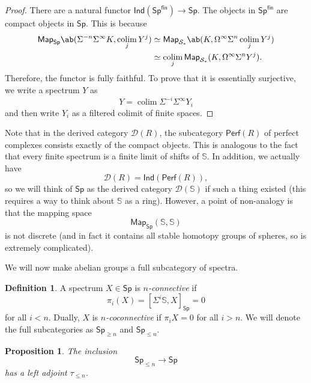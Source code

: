 \documentclass[10pt, oneside]{memoir}
\newtheorem{prop}[thm]{Proposition}
\theoremstyle{definition}
\newtheorem{defn}[thm]{Definition}
\theoremstyle{remark}
\theoremstyle{plain}
\theoremstyle{definition}
\theoremstyle{remark}
\newcommand{\bS}{\mathbb{S}}
\newcommand{\mc}[1]{\mathcal{#1}}
\newcommand{\ms}[1]{\mathsf{#1}}
\newcommand{\1}{\mathbf{1}}
\newcommand{\2}{\mathbf{2}}
\newcommand{\3}{\mathbf{3}}
\DeclareMathOperator*{\colim}{colim}
\begin{document}
\begin{proof}
    There are a natural functor \(\ms{Ind}(\ms{Sp}^{\ms{fin}}) \to \ms{Sp} \). The objects in \(\ms{Sp}^{\ms{fin}} \) are compact objects in \(\ms{Sp} \). This is because
    \begin{align*}
        \ms{Map}_{\ms{Sp}}\ab(\Sigma^{-n} \Sigma^{\infty} K, \colim_j Y^j) &\simeq \ms{Map}_{\mc{S}_*} \ab(K, \Omega^{\infty} \Sigma^n \colim_j Y^j) \\
        &\simeq \colim_j \ms{Map}_{\mc{S}_*}(K, \Omega^{\infty} \Sigma^n Y^j).
    \end{align*}
    Therefore, the functor is fully faithful. To prove that it is essentially surjective, we write a spectrum \(Y \) as
    \[ Y = \colim \Sigma^{-i} \Sigma^{\infty} Y_i \]
    and then write \(Y_i \) as a filtered colimit of finite spaces.
\end{proof}

Note that in the derived category \(\mc{D}(R) \), the subcategory \(\ms{Perf}(R) \) of perfect complexes consists exactly of the compact objects. This is analogous to the fact that every finite spectrum is a finite limit of shifts of \(\bS \). In addition, we actually have
\[ \mc{D}(R) = \ms{Ind}(\ms{Perf}(R)), \]
so we will think of \(\ms{Sp} \) as the derived category \(\mc{D}(\bS) \) if such a thing existed (this requires a way to think about \(\bS \) as a ring). However, a point of non-analogy is that the mapping space
\[ \ms{Map}_{\ms{Sp}}(\bS, \bS) \]
is not discrete (and in fact it contains all stable homotopy groups of spheres, so is extremely complicated).

We will now make abelian groups a full subcategory of spectra.
\begin{defn}
    A spectrum \(X \in \ms{Sp} \) is \textit{\(n \)-connective} if 
    \[ \pi_i (X) = [\Sigma^i \bS, X]_{\ms{Sp}} = 0 \] 
    for all \(i < n \). Dually, \(X \) is \textit{\(n \)-coconnective} if \(\pi_i X = 0 \) for all \(i > n \). We will denote the full subcategories as \(\ms{Sp}_{\geq n} \) and \(\ms{Sp}_{\leq n} \).
\end{defn}

\begin{prop}
    The inclusion
    \[ \ms{Sp}_{\leq n} \to \ms{Sp} \]
    has a left adjoint \(\tau_{\leq n} \).
\end{prop}
\end{document}
